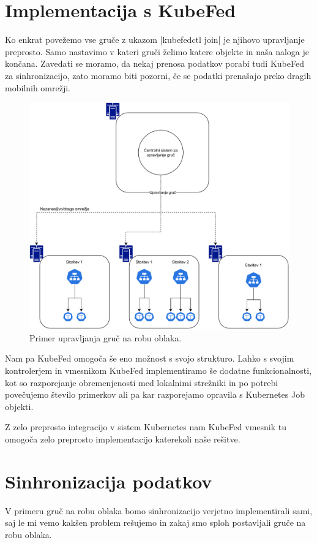 \documentclass[a4paper, 12pt]{book}
\begin{document}
\section{Implementacija s KubeFed}
Ko enkrat povežemo vse gruče z ukazom \spverb|kubefedctl join| je njihovo upravljanje preprosto.
Samo nastavimo v kateri gruči želimo katere objekte in naša naloga je končana.
Zavedati se moramo, da nekaj prenosa podatkov porabi tudi KubeFed za sinhronizacijo, zato moramo biti pozorni, če se podatki prenašajo preko dragih mobilnih omrežji.
\begin{figure}[h]
\begin{center}
\includegraphics[width=1.0\textwidth]{images/upravljanje-robnih-gruc.pdf}
\end{center}
\caption{Primer upravljanja gruč na robu oblaka.}
\label{problem-prevelike-latence}
\end{figure}

Nam pa KubeFed omogoča še eno možnost s svojo strukturo.
Lahko s svojim kontrolerjem in vmesnikom KubeFed implementiramo še dodatne funkcionalnosti, kot so razporejanje obremenjenosti med lokalnimi strežniki in po potrebi povečujemo število primerkov ali pa kar razporejamo opravila s Kubernetes Job objekti.

Z zelo preprosto integracijo v sistem Kubernetes nam KubeFed vmesnik tu omogoča zelo preprosto implementacijo katerekoli naše rešitve.
\section{Sinhronizacija podatkov}
V primeru gruč na robu oblaka bomo sinhronizacijo verjetno implementirali sami, saj le mi vemo kakšen problem rešujemo in zakaj smo sploh postavljali gruče na robu oblaka.
\end{document}
